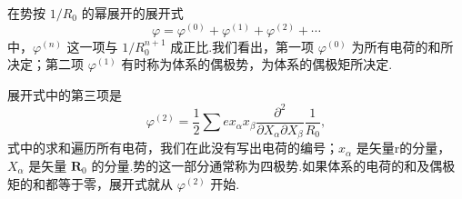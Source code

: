 在势按 $1/R_0$ 的幂展开的展开式
\begin{equation}
  \varphi=\varphi^{(0)}+\varphi^{(1)}+\varphi^{(2)}+\cdots
\end{equation}
中，$\varphi^{(n)}$ 这一项与 $1/R_0^{n+1}$ 成正比.我们看出，第一项 $\varphi^{(0)}$ 为所有电荷的和所决定；第二项 $\varphi^{(1)}$ 有时称为体系的偶极势，为体系的偶极矩所决定.

展开式中的第三项是
\begin{equation}
  \varphi^{(2)}=\frac{1}{2}\sum ex_\alpha x_\beta
  \frac{\partial^2}{\partial X_\alpha\partial X_\beta}\frac{1}{R_0},
\end{equation}
式中的求和遍历所有电荷，我们在此没有写出电荷的编号；$x_\alpha$ 是矢量r的分量，$X_\alpha$ 是矢量 $\boldsymbol{R}_0$ 的分量.势的这一部分通常称为四极势.如果体系的电荷的和及偶极矩的和都等于零，展开式就从 $\varphi^{(2)}$ 开始.

